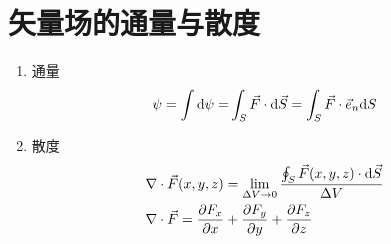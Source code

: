 \section{矢量场的通量与散度}
\begin{enumerate}
	\item 通量
		\begin{eqnarray}
		&\psi  = \int {{\rm{d}}\psi  = } \int_S {\vec F \cdot {\rm{d}}\vec S}  = \int_S {\vec F \cdot {{\vec e}_n}{\rm{d}}S}&
		\end{eqnarray}
	\item 散度
		\begin{eqnarray}
		&\nabla  \cdot \vec F(x,y,z) = \mathop {\lim }\limits_{\Delta V \to 0} \frac{{\oint_S {\vec F(x,y,z) \cdot {\rm{d}}\vec S} }}{{\Delta V}}& \\
		&\nabla  \cdot \vec F = \frac{{\partial {F_x}}}{{\partial x}} + \frac{{\partial {F_y}}}{{\partial y}} + \frac{{\partial {F_z}}}{{\partial z}}&
		\end{eqnarray}
\end{enumerate}

